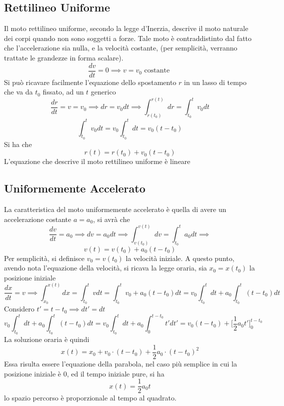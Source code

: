 \documentclass[10pt, letterpaper]{report}
\begin{document}
\subsection{Rettilineo Uniforme} 
Il moto rettilineo uniforme, secondo la legge d'Inerzia, descrive il moto naturale dei corpi quando non sono soggetti a forze. Tale moto è contraddistinto dal fatto che 
l'accelerazione sia nulla, e la velocità costante, (per semplicità, verranno trattate 
le grandezze in forma scalare).
$$\frac{dv}{dt}=0\implies v = v_0 \text{ costante }$$
Si può ricavare facilmente l'equazione dello spostamento $r$ in un 
lasso di tempo che va da $t_0$ fissato, ad un $t$ generico
$$ \frac{dr}{dt}=v=v_0\implies dr=v_0dt\implies\int_{r(t_0)}^{r(t)}dr=\int_{t_0}^tv_0dt $$
$$\int_{t_0}^tv_0dt=v_0\int_{t_0}^tdt=v_0(t-t_0) $$
Si ha che  
$$ r(t)=r(t_0)+v_0(t-t_0)$$
L'equazione che descrive il moto rettilineo uniforme è lineare
\begin{center}
\end{center} 
\subsection{Uniformemente Accelerato}
La caratteristica del moto uniformemente accelerato è quella di avere un accelerazione costante 
$a = a_0 $, si avrà che 
$$ \frac{dv}{dt}=a_0\implies dv =a_0dt\implies \int_{v(t_0)}^{v(t)}dv=\int_{t_0}^ta_0dt\implies$$
$$v(t)=v(t_0)+a_0(t-t_0) $$
Per semplicità, si definisce $v_0=v(t_0)$ la velocità iniziale. A questo punto, avendo nota l'equazione 
della velocità, si ricava la legge oraria, sia $x_0=x(t_0)$ la posizione iniziale 
$$ \frac{dx}{dt}=v\implies \int_{x_0}^{x(t)}dx=\int_{t_0}^t vdt = \int_{t_0}^tv_0+a_0(t-t_0)dt= 
v_0\int_{t_0}^tdt+a_0\int_{t_0}^t(t-t_0)dt$$
Considero $t'=t-t_0\implies dt'=dt$ 
$$ v_0\int_{t_0}^tdt+a_0\int_{t_0}^t(t-t_0)dt= 
v_0\int_{t_0}^tdt+a_0\int_{0}^{t-t_0}t'dt'=v_0(t-t_0)+\Big[\dfrac{1}{2}a_0t'\Big]_0^{t-t_0}$$
La soluzione oraria è quindi 
$$ x(t)=x_0+v_0\cdot (t-t_0)+\frac{1}{2}a_0\cdot (t-t_0)^2$$
Essa risulta essere l'equazione della parabola, nel caso più semplice in cui la posizione 
iniziale è 0, ed il tempo iniziale pure, si ha  
$$ x(t)=\dfrac{1}{2}a_0t$$
lo spazio percorso è proporzionale al tempo al 
quadrato.
\end{document}
